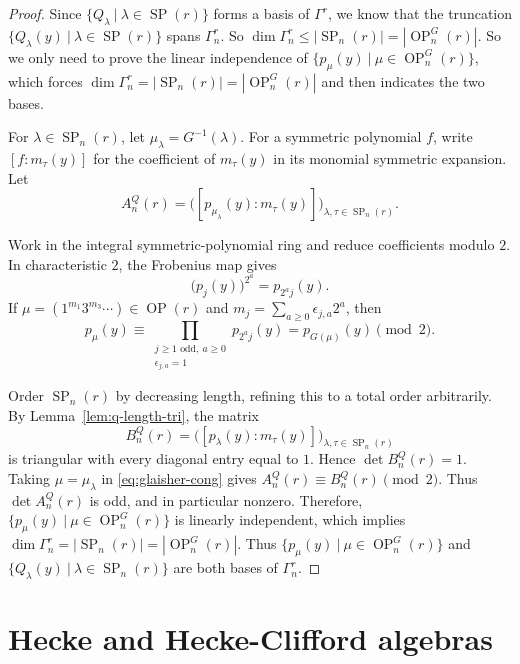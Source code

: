 \documentclass[11pt]{amsart}
\numberwithin{equation}{section}
\theoremstyle{plain}
\theoremstyle{definition}
\theoremstyle{remark}
\begin{document}
\begin{proof}
Since $\{Q_\lambda~|~\lambda\in\operatorname{SP}(r)\}$
forms a basis of $\Gamma^r$, we know that the truncation $\{Q_\lambda(y)~|~\lambda\in\operatorname{SP}(r)\}$ spans $\Gamma_n^r$. So $\dim\Gamma_n^r\leq |\operatorname{SP}_{n}(r)|=|\operatorname{OP}_n^G(r)|$. So we only need to prove the linear independence of $\{p_\mu(y)~|~\mu\in\operatorname{OP}_n^G(r)\}$, which forces $\dim\Gamma_n^r=|\operatorname{SP}_{n}(r)|=|\operatorname{OP}_n^G(r)|$ and then indicates the two bases.

For $\lambda\in\operatorname{SP}_n(r)$, let
$\mu_\lambda=G^{-1}(\lambda)$.
For a symmetric polynomial $f$, write $[f:m_\tau(y)]$
for the coefficient of $m_\tau(y)$ in its monomial symmetric
expansion. Let
$$
A_n^Q(r)
=
\bigl([p_{\mu_\lambda}(y):m_\tau(y)]\bigr)_
{\lambda,\tau\in\operatorname{SP}_n(r)}.
$$

Work in the integral symmetric-polynomial ring and reduce
coefficients modulo $2$. In characteristic $2$, the Frobenius map
gives
$$
\bigl(p_j(y)\bigr)^{2^a}=p_{2^aj}(y).
$$
If
$\mu=(1^{m_1}3^{m_3}\cdots)\in\operatorname{OP}(r)$ and
$m_j=\sum_{a\geq0}\epsilon_{j,a}2^a$, then
\begin{equation}\label{eq:glaisher-cong}
p_\mu(y)
\equiv
\prod_{\substack{j\geq 1\text{ odd},\ a\geq 0\\
                         \epsilon_{j,a}=1}}
p_{2^aj}(y)
=
p_{G(\mu)}(y)
\pmod 2.
\end{equation}

Order $\operatorname{SP}_n(r)$ by decreasing length, refining this
to a total order arbitrarily. By
Lemma~\ref{lem:q-length-tri}, the matrix
$$
B_n^Q(r)
=
\bigl([p_\lambda(y):m_\tau(y)]\bigr)_
{\lambda,\tau\in\operatorname{SP}_n(r)}
$$
is triangular with every diagonal entry equal to $1$. Hence
$\det B_n^Q(r)=1$. Taking $\mu=\mu_\lambda$ in
\eqref{eq:glaisher-cong} gives
$A_n^Q(r)\equiv B_n^Q(r)\pmod2$. Thus $\det A_n^Q(r)$ is odd, and
in particular nonzero. Therefore, $\{p_\mu(y)~|~\mu\in\operatorname{OP}_n^G(r)\}$ is linearly independent, which implies $\dim\Gamma_n^r=|\operatorname{SP}_{n}(r)|=|\operatorname{OP}_n^G(r)|$. Thus $\{p_\mu(y)~|~\mu\in\operatorname{OP}_n^G(r)\}$ and 
$\{Q_\lambda(y)~|~\lambda\in\operatorname{SP}_n(r)\}$ are both bases of $\Gamma_n^r$.
\end{proof}


\section{Hecke and Hecke-Clifford algebras} \label{sec:quantum}
\end{document}
